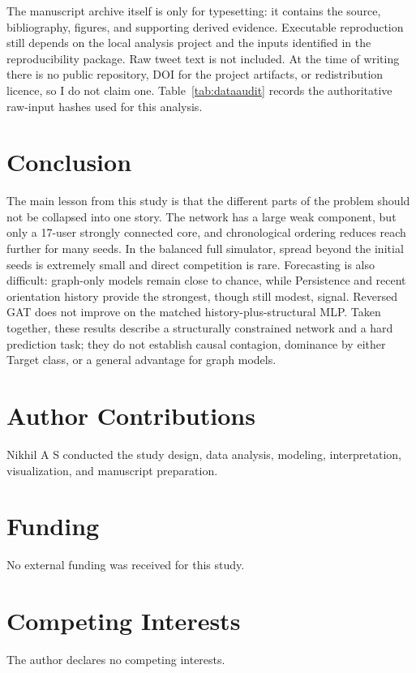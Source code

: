 \documentclass[11pt,a4paper]{article}
\begin{document}
The manuscript archive itself is only for typesetting: it contains the source, bibliography, figures, and supporting derived evidence. Executable reproduction still depends on the local analysis project and the inputs identified in the reproducibility package. Raw tweet text is not included. At the time of writing there is no public repository, DOI for the project artifacts, or redistribution licence, so I do not claim one. Table~\ref{tab:dataaudit} records the authoritative raw-input hashes used for this analysis.

\section{Conclusion}
The main lesson from this study is that the different parts of the problem should not be collapsed into one story. The network has a large weak component, but only a 17-user strongly connected core, and chronological ordering reduces reach further for many seeds. In the balanced full simulator, spread beyond the initial seeds is extremely small and direct competition is rare. Forecasting is also difficult: graph-only models remain close to chance, while Persistence and recent orientation history provide the strongest, though still modest, signal. Reversed GAT does not improve on the matched history-plus-structural MLP. Taken together, these results describe a structurally constrained network and a hard prediction task; they do not establish causal contagion, dominance by either Target class, or a general advantage for graph models.

\section*{Author Contributions}
Nikhil A S conducted the study design, data analysis, modeling, interpretation, visualization, and manuscript preparation.
\section*{Funding}
No external funding was received for this study.
\section*{Competing Interests}
The author declares no competing interests.
\nocite{*}
\begingroup\small\setlength{\bibsep}{4pt}


\endgroup
\end{document}
